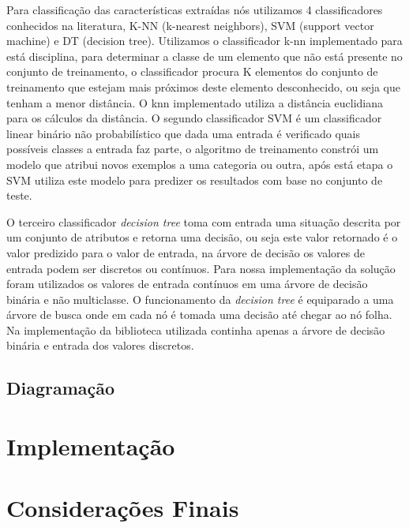 \documentclass[12pt]{article}
\begin{document}
	Para classificação das características extraídas nós utilizamos 4 classificadores conhecidos na literatura, K-NN (k-nearest neighbors), SVM (support vector machine) e DT (decision tree). Utilizamos o classificador k-nn implementado para está disciplina, para determinar a classe de um elemento que não está presente no conjunto de treinamento, o classificador procura K elementos do conjunto de treinamento que estejam mais próximos deste elemento desconhecido, ou seja que tenham a menor distância. O knn implementado utiliza a distância euclidiana para os cálculos da distância.
	O segundo classificador SVM é um classificador linear binário não probabilístico que dada uma entrada é verificado quais possíveis classes a entrada faz parte, o algoritmo de treinamento constrói um modelo que atribui novos exemplos a uma categoria ou outra, após está etapa o SVM utiliza este modelo para predizer os resultados com base no conjunto de teste.

	O terceiro classificador \textit{decision tree} toma com entrada uma situação descrita por um conjunto de atributos e retorna uma decisão, ou seja este valor retornado é o valor predizido para o valor de entrada, na árvore de decisão os valores de entrada podem ser discretos ou contínuos. Para nossa implementação da solução foram utilizados os valores de entrada contínuos em uma árvore de decisão binária e não multiclasse. O funcionamento da \textit{decision tree} é equiparado a uma árvore de busca onde em cada nó é tomada uma decisão até chegar ao nó folha. Na implementação da biblioteca utilizada continha apenas a árvore de decisão binária e entrada dos valores discretos.





\subsection{Diagramação}\label{sec:diagramacao}
	
	




\section{Implementação}



\section{Considerações Finais}
\end{document}
